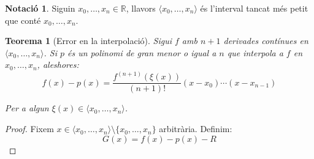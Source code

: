 \documentclass[a4paper,12pt]{article}
\theoremstyle{definition}
\newtheorem*{notation}{Notació}
\theoremstyle{plain}
\newtheorem{theorem}{Teorema}[section]
\theoremstyle{remark}
\begin{document}
\begin{notation}
Siguin $x_0,\allowbreak\dots,\allowbreak x_n\in\mathbb R$, llavors
$\langle x_0,\allowbreak\dots,\allowbreak x_n\rangle$ és l'interval tancat més
petit que conté $x_0,\allowbreak\dots,\allowbreak x_n$.
\end{notation}

\begin{theorem}[Error en la interpolació]
Sigui $f$ amb $n+1$ derivades contínues en
$\langle x_0,\allowbreak\dots,\allowbreak x_n\rangle$. Si $p$ és un polinomi
de gran menor o igual a $n$ que interpola a $f$ en
$x_0,\allowbreak\dots,\allowbreak x_n$, aleshores:
\begin{equation*}
f(x)-p(x)=\frac{f^{(n+1)}(\xi(x))}{(n+1)!}(x-x_0)\cdots(x-x_{n-1})
\end{equation*}

Per a algun $\xi(x)\in\langle x_0,\allowbreak\dots,\allowbreak x_n\rangle$.

\end{theorem}

\begin{proof}
Fixem $x\in\langle x_0,\allowbreak\dots,\allowbreak x_n\rangle\setminus
\{x_0,\allowbreak\dots,\allowbreak x_n\}$ arbitrària. Definim:
\begin{equation}
G(x) = f(x) - p(x) - R
\end{equation}
\end{proof}
\end{document}
